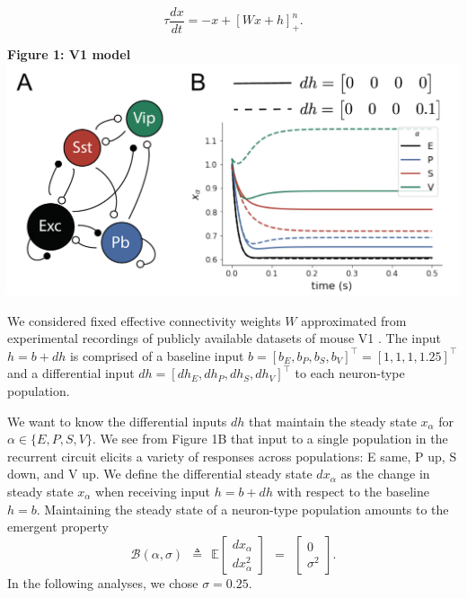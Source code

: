 \documentclass[11pt]{article}
\begin{document}
\begin{equation}
\tau \frac{dx}{dt} = -x + [W x+ h]_+^n.
\end{equation}

\begin{center}
\textbf{Figure 1: V1 model} \\
\includegraphics[scale=.4]{figs/V1_responses.pdf}
\end{center}

We considered fixed effective connectivity weights $W$ approximated from experimental recordings of publicly available datasets of mouse V1 \cite{allen2018layer, billeh2019systematic}.
The input $h = b + dh$ is comprised of a baseline input  $b = \left[ b_E, b_P , b_S , b_V \right]^\top = \left[ 1, 1, 1 ,1.25 \right]^\top$  and a differential input $dh = \left[ dh_E , dh_P , dh_S , dh_V\right]^\top$ to each neuron-type population.  

We want to know the differential inputs $dh$ that maintain the steady state $x_{\alpha}$ for $\alpha \in \{E, P, S, V\}$. 
We see from Figure 1B that input to a single population in the recurrent circuit elicits a variety of responses across populations: E same, P up, S down, and V up.
We define the differential steady state $dx_{\alpha}$ as the change in steady state $x_{\alpha}$ when receiving input $h=b + dh$ with respect to the baseline $h = b$.
Maintaining the steady state of a neuron-type population amounts to the emergent property 
\begin{equation}
\mathcal{B}(\alpha, \sigma) ~~\triangleq~~ 
\mathbb{E} \begin{bmatrix} dx_{\alpha} \\ dx_{\alpha}^2 \end{bmatrix} ~~=~~ \begin{bmatrix} 0 \\ \sigma^2 \end{bmatrix}.
\end{equation}
In the following analyses, we chose $\sigma=0.25$.
\end{document}
